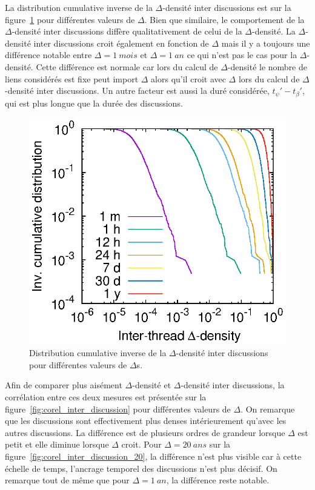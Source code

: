 La distribution cumulative inverse de la $\Delta$-densité inter discussions est sur la figure~\ref{fig:inter_dens_discussion} pour différentes valeurs de $\Delta$.
Bien que similaire, le comportement de la $\Delta$-densité inter discussions diffère qualitativement de celui de la $\Delta$-densité.
La $\Delta$-densité inter discussions croit également en fonction de $\Delta$ mais il y a toujours une différence notable entre $\Delta= 1\  mois$ et $\Delta= 1\ an$ ce qui n'est pas le cas pour la $\Delta$-densité.
Cette différence est normale car lors du calcul de $\Delta$-densité le nombre de liens considérés est fixe peut import $\Delta$ alors qu'il croit avec $\Delta$ lors du calcul de $\Delta$-densité inter discussions.
Un autre facteur est aussi la duré considérée, $t_{\psi}'-t_{\beta}'$, qui est plus longue que la durée des discussions.
\begin{figure}
\centering
	\includegraphics[width=0.48\linewidth]{img/mailing/inter_delta.eps}
\caption{Distribution cumulative inverse de la $\Delta$-densité inter discussions pour différentes valeurs de $\Delta$s.}
\label{fig:inter_dens_discussion}
\end{figure}


Afin de comparer plus aisément $\Delta$-densité et $\Delta$-densité inter discussions, la corrélation entre ces deux mesures est présentée sur la figure~\ref{fig:corel_inter_discussion} pour différentes valeurs de $\Delta$.
On remarque que les discussions sont effectivement plus denses intérieurement qu'avec les autres discussions.
La différence est de plusieurs ordres de grandeur lorsque $\Delta$ est petit et elle diminue lorsque $\Delta$ croit.
Pour $\Delta=20\ ans$ sur la figure~\ref{fig:corel_inter_discussion_20}, la différence n'est plus visible car à cette échelle de temps, l'ancrage temporel des discussions n'est plus décisif.
On remarque tout de même que pour $\Delta=1\ an$, la différence reste notable.
 

